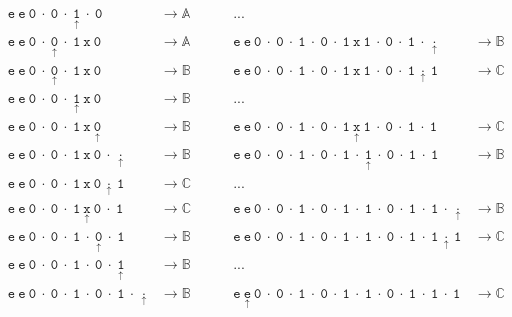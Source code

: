 \documentclass[Master.tex]{subfiles}
\begin{document}
\begin{equation*}
\begin{aligned}
&\mathtt{e\ e\ 0\ \cdot\ 0\ \cdot\ \underset{\uparrow}{1}\ \cdot\ 0} & \rightarrow \mathbb{A}\ \ \ \ \ \ \ \ \ \ & ...&\\
&\mathtt{e\ e\ 0\ \cdot\ \underset{\uparrow}{0}\ \cdot\ 1\ x\ 0} & \rightarrow \mathbb{A}\ \ \ \ \ \ \ \ \ \ & \mathtt{e\ e\ 0\ \cdot\ 0\ \cdot\ 1\ \cdot\ 0\ \cdot\ 1\ x\ 1\ \cdot\ 0\ \cdot\ 1\ \cdot\ \underset{\uparrow}{\cdot}} & \rightarrow \mathbb{B}\\
&\mathtt{e\ e\ 0\ \cdot\ \underset{\uparrow}{0}\ \cdot\ 1\ x\ 0} & \rightarrow \mathbb{B}\ \ \ \ \ \ \ \ \ \ & \mathtt{e\ e\ 0\ \cdot\ 0\ \cdot\ 1\ \cdot\ 0\ \cdot\ 1\ x\ 1\ \cdot\ 0\ \cdot\ 1\ \underset{\uparrow}{\cdot}\ 1} & \rightarrow \mathbb{C}\\
&\mathtt{e\ e\ 0\ \cdot\ 0\ \cdot\ \underset{\uparrow}{1}\ x\ 0} & \rightarrow \mathbb{B}\ \ \ \ \ \ \ \ \ \ & ...&\\
&\mathtt{e\ e\ 0\ \cdot\ 0\ \cdot\ 1\ x\ \underset{\uparrow}{0}} & \rightarrow \mathbb{B}\ \ \ \ \ \ \ \ \ \ & \mathtt{e\ e\ 0\ \cdot\ 0\ \cdot\ 1\ \cdot\ 0\ \cdot\ 1\ \underset{\uparrow}{x}\ 1\ \cdot\ 0\ \cdot\ 1\ \cdot\ 1} & \rightarrow \mathbb{C}\\
&\mathtt{e\ e\ 0\ \cdot\ 0\ \cdot\ 1\ x\ 0\ \cdot\ \underset{\uparrow}{\cdot}} & \rightarrow \mathbb{B}\ \ \ \ \ \ \ \ \ \ & \mathtt{e\ e\ 0\ \cdot\ 0\ \cdot\ 1\ \cdot\ 0\ \cdot\ 1\ \cdot\ \underset{\uparrow}{1}\ \cdot\ 0\ \cdot\ 1\ \cdot\ 1} & \rightarrow \mathbb{B}\\
&\mathtt{e\ e\ 0\ \cdot\ 0\ \cdot\ 1\ x\ 0\ \underset{\uparrow}{\cdot}\ 1} & \rightarrow \mathbb{C}\ \ \ \ \ \ \ \ \ \ & ...&\\
&\mathtt{e\ e\ 0\ \cdot\ 0\ \cdot\ 1\ \underset{\uparrow}{x}\ 0\ \cdot\ 1} & \rightarrow \mathbb{C}\ \ \ \ \ \ \ \ \ \ & \mathtt{e\ e\ 0\ \cdot\ 0\ \cdot\ 1\ \cdot\ 0\ \cdot\ 1\ \cdot\ 1\ \cdot\ 0\ \cdot\ 1\ \cdot\ 1\ \cdot\ \underset{\uparrow}{\cdot}} & \rightarrow \mathbb{B}\\
&\mathtt{e\ e\ 0\ \cdot\ 0\ \cdot\ 1\ \cdot\ \underset{\uparrow}{0}\ \cdot\ 1} & \rightarrow \mathbb{B}\ \ \ \ \ \ \ \ \ \ & \mathtt{e\ e\ 0\ \cdot\ 0\ \cdot\ 1\ \cdot\ 0\ \cdot\ 1\ \cdot\ 1\ \cdot\ 0\ \cdot\ 1\ \cdot\ 1\ \underset{\uparrow}{\cdot}\ 1} & \rightarrow \mathbb{C}\\
&\mathtt{e\ e\ 0\ \cdot\ 0\ \cdot\ 1\ \cdot\ 0\ \cdot\ \underset{\uparrow}{1}} & \rightarrow \mathbb{B}\ \ \ \ \ \ \ \ \ \ & ...&\\
&\mathtt{e\ e\ 0\ \cdot\ 0\ \cdot\ 1\ \cdot\ 0\ \cdot\ 1\ \cdot\ \underset{\uparrow}{\cdot}} & \rightarrow \mathbb{B}\ \ \ \ \ \ \ \ \ \ & \mathtt{e\ \underset{\uparrow}{e}\ 0\ \cdot\ 0\ \cdot\ 1\ \cdot\ 0\ \cdot\ 1\ \cdot\ 1\ \cdot\ 0\ \cdot\ 1\ \cdot\ 1\ \cdot\ 1} & \rightarrow \mathbb{C}\\

\end{aligned}
\end{equation*}
\end{document}
